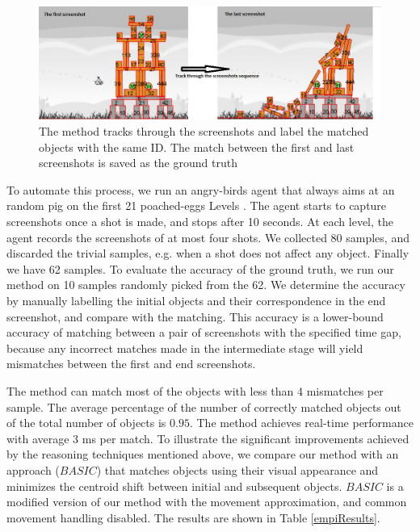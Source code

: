 \documentclass[letterpaper]{article}
\begin{document}
\begin{figure}[h!]
\centering\includegraphics[scale=0.32]{TrackingBackup.png}\caption{The method tracks through the screenshots and label the matched objects with the same ID. The match between the first and last screenshots is saved as the ground truth }
\label{Tracking}
\end{figure}

To automate this process, we run an angry-birds agent that always aims at an random pig on the first 21 poached-eggs Levels \cite{abGame}. The agent starts to capture screenshots once a shot is made, and stops after 10 seconds. At each level, the agent records the screenshots of at most four shots.
We collected 80 samples, and discarded the trivial samples, e.g. when a shot does not affect any object. Finally we have 62 samples. To evaluate the accuracy of the ground truth, we run our method on 10 samples randomly picked from the 62. We determine the accuracy by manually labelling the initial objects and their correspondence in the end screenshot, and compare with the matching. This accuracy is a lower-bound accuracy of matching between a pair of screenshots with the specified time gap, because any incorrect matches made in the intermediate stage will yield mismatches between the first and end screenshots.  

The method can match most of the objects with less than 4 mismatches per sample. The average percentage of the number of correctly matched objects out of the total number of objects is $0.95$. The method achieves real-time performance with average 3 ms per match. To illustrate the significant improvements achieved by the reasoning techniques mentioned above, we compare our method with an approach ($BASIC$) that matches objects using their visual appearance and minimizes the centroid shift between initial and subsequent objects. $BASIC$ is a modified version of our method with the movement approximation, and common movement handling disabled. The results are shown in Table \ref{empiResults}.
\end{document}
